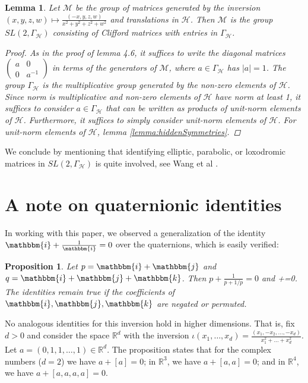\documentclass[reqno,10pt]{amsart}
\let\oldalign\align
\let\oldendalign\endalign
\renewenvironment{align}
  {\linenomathNonumbers\oldalign}
  {\oldendalign\endlinenomath}
\def\[#1\]{\begin{linenomath}\begin{align}#1\end{align}\end{linenomath}}
\def\[#1\]{\begin{align}#1\end{align}}
\newcommand{\ii}{\mathbbm{i}}
\newcommand{\R}{\mathbb{R}}
\newcommand{\kk}{\mathbbm{k}}
\newcommand{\jj}{\mathbbm{j}}
\newcommand{\norm}[1]{\left\vert #1 \right \vert}
\newtheorem{prop}[thm]{Proposition}
\newtheorem{lemma}[thm]{Lemma}
\numberwithin{thm}{section}
\theoremstyle{definition}
\theoremstyle{definition}
\numberwithin{equation}{section}
\newcommand{\Mod}{\mathcal M}
\begin{document}
\begin{lemma}
Let $\mathcal M$ be the group of matrices generated by the inversion $(x,y,z,w)\mapsto \frac{(-x,y,z,w)}{x^2+y^2+z^2+w^2}$ and translations in $\mathcal H$. Then $\mathcal M$ is the group $SL(2,\Gamma_\mathcal{H})$ consisting of Clifford matrices with entries in $\Gamma_\mathcal{H}$.
\begin{proof}
As in the proof of lemma 4.6, it suffices to write  the diagonal matrices 
$\begin{pmatrix}
a & 0 \\
0 & a^{-1} 
\end{pmatrix}$ in terms of the generators of $\Mod$, where $a\in \Gamma_\mathcal{H}$ has $\norm{a}=1$. The group $\Gamma_\mathcal{H}$ is the multiplicative group generated by the non-zero elements of $\mathcal H$. Since norm is multiplicative and non-zero elements of $\mathcal{H}$ have norm at least 1, it suffices to consider $a\in \Gamma_\mathcal{H}$ that can be written as products of unit-norm elements of $\mathcal H$. Furthermore, it suffices to simply consider unit-norm elements of $\mathcal H$. For unit-norm elements of $\mathcal H$, lemma \ref{lemma:hiddenSymmetries}.
\end{proof}
\end{lemma}


We conclude by mentioning that identifying elliptic, parabolic, or loxodromic matrices in $SL(2,\Gamma_\mathcal{H})$ is quite involved, see Wang et al \cite{wang1998note}.



\section{A note on quaternionic identities}
\label{sec:identities}
In working with this paper, we observed a generalization of the identity $\ii+\frac{1}{\ii}=0$  over the quaternions, which is easily verified:

\begin{prop}
Let $p=\ii+\jj$ and $q=\ii+\jj+\kk$. Then $p+\frac{1}{p+1/p}=0$ and \[q+=0.\] The identities remain true if the coefficients of $\ii, \jj,\kk$ are negated or permuted.
\end{prop}

No analogous identities for this inversion hold in higher dimensions. That is, fix $d>0$ and consider the space $\R^d$ with the inversion $\iota(x_1, \ldots, x_d)=\frac{(x_1, -x_2, \ldots, -x_d)}{x_1^2+\ldots+x_d^2}$. Let $a=(0,1,1, \ldots, 1)\in \R^d$.  The proposition states that for the complex numbers ($d=2$) we have $a+[a]=0$; in $\R^3$, we have $a+[a,a]=0$; and in $\R^4$, we have $a+[a,a,a,a]=0$.
\end{document}
